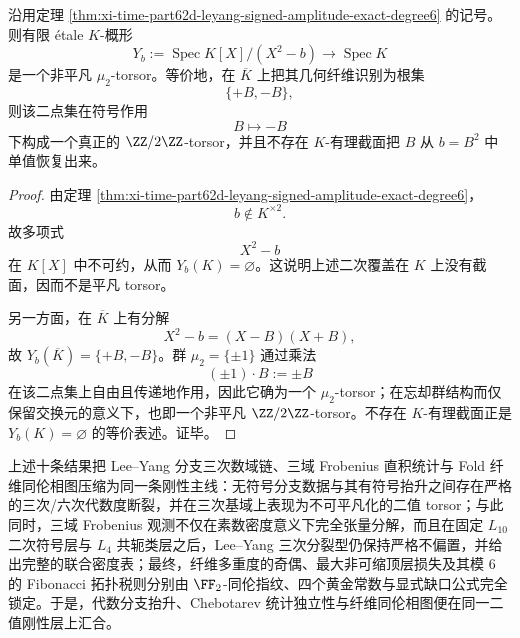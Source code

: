 \begin{proposition}\label{prop:xi-time-part62d-leyang-square-root-nontrivial-torsor}
沿用定理 \ref{thm:xi-time-part62d-leyang-signed-amplitude-exact-degree6} 的记号。则有限 \'etale \(K\)-概形
\[
Y_b:=\operatorname{Spec}K[X]/(X^2-b)
\longrightarrow
\operatorname{Spec}K
\]
是一个非平凡 \(\mu_2\)-torsor。等价地，在 \(\overline K\) 上把其几何纤维识别为根集
\[
\{+B,-B\},
\]
则该二点集在符号作用
\[
B\longmapsto -B
\]
下构成一个真正的 \(\ZZ/2\ZZ\)-torsor，并且不存在 \(K\)-有理截面把 \(B\) 从 \(b=B^2\) 中单值恢复出来。
\end{proposition}
\begin{proof}
由定理 \ref{thm:xi-time-part62d-leyang-signed-amplitude-exact-degree6}，
\[
b\notin K^{\times 2}.
\]
故多项式
\[
X^2-b
\]
在 \(K[X]\) 中不可约，从而 \(Y_b(K)=\varnothing\)。这说明上述二次覆盖在 \(K\) 上没有截面，因而不是平凡 torsor。

另一方面，在 \(\overline K\) 上有分解
\[
X^2-b=(X-B)(X+B),
\]
故 \(Y_b(\overline K)=\{+B,-B\}\)。群 \(\mu_2=\{\pm 1\}\) 通过乘法
\[
(\pm 1)\cdot B:=\pm B
\]
在该二点集上自由且传递地作用，因此它确为一个 \(\mu_2\)-torsor；在忘却群结构而仅保留交换元的意义下，也即一个非平凡 \(\ZZ/2\ZZ\)-torsor。不存在 \(K\)-有理截面正是 \(Y_b(K)=\varnothing\) 的等价表述。证毕。
\end{proof}



\noindent
上述十条结果把 Lee--Yang 分支三次数域链、三域 Frobenius 直积统计与 Fold 纤维同伦相图压缩为同一条刚性主线：无符号分支数据与其有符号抬升之间存在严格的三次/六次代数度断裂，并在三次基域上表现为不可平凡化的二值 torsor；与此同时，三域 Frobenius 观测不仅在素数密度意义下完全张量分解，而且在固定 \(L_{10}\) 二次符号层与 \(L_4\) 共轭类层之后，Lee--Yang 三次分裂型仍保持严格不偏置，并给出完整的联合密度表；最终，纤维多重度的奇偶、最大非可缩顶层损失及其模 \(6\) 的 Fibonacci 拓扑税则分别由 \(\FF_2\)-同伦指纹、四个黄金常数与显式缺口公式完全锁定。于是，代数分支抬升、Chebotarev 统计独立性与纤维同伦相图便在同一二值刚性层上汇合。

\endinput
